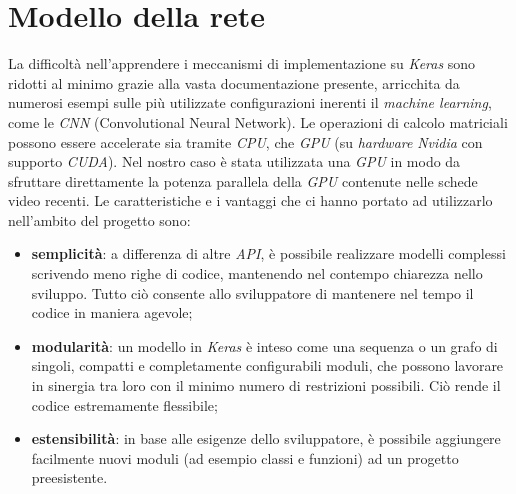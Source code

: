 \section{Modello della rete}
La difficoltà nell’apprendere i meccanismi di implementazione su \textit{Keras} sono ridotti al minimo grazie alla vasta documentazione presente, arricchita da numerosi esempi sulle più utilizzate configurazioni inerenti il \textit{machine learning}, come le \textit{CNN} (Convolutional Neural Network).
Le operazioni di calcolo matriciali possono essere accelerate sia tramite \textit{CPU}, che \textit{GPU} (su \textit{hardware} \textit{Nvidia} con supporto \textit{CUDA}). Nel nostro caso è stata utilizzata una \textit{GPU} in modo da sfruttare direttamente la potenza parallela della \textit{GPU} contenute nelle schede video recenti.
\vspace*{2ex}
\vspace*{2ex}
\noindent Le caratteristiche e i vantaggi che ci hanno portato ad utilizzarlo nell’ambito del progetto sono:
\begin{itemize}
	\item \textbf{semplicità}: a differenza di altre \textit{API}, è possibile realizzare modelli complessi scrivendo meno righe di codice, mantenendo nel contempo chiarezza nello sviluppo. Tutto ciò consente allo sviluppatore di mantenere nel tempo il codice in maniera agevole;
	\item \textbf{modularità}: un modello in \textit{Keras} è inteso come una sequenza o un grafo di singoli, compatti e completamente configurabili moduli, che possono lavorare in sinergia tra loro con il minimo numero di restrizioni possibili. Ciò rende il codice estremamente flessibile;
	\item \textbf{estensibilità}: in base alle esigenze dello sviluppatore, è possibile aggiungere facilmente nuovi moduli (ad esempio classi e funzioni) ad un progetto preesistente.
\end{itemize}
